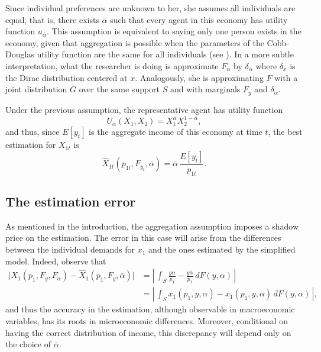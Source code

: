 \documentclass[english, a4paper,12pt]{article}
\begin{document}
Since individual preferences are unknown to her, she assumes all individuals are equal, that is, there exists $\overline{\alpha}$ such that every agent in this economy has utility function $u_{\overline{\alpha}}$. This assumption is equivalent to saying only one person exists in the economy, given that aggregation is possible when the parameters of the Cobb-Douglas utility function are the same for all individuals (see ). In a more subtle interpretation, what the researcher is doing is approximate $F_{\alpha}$ by $\delta_{\overline{\alpha}}$ where $\delta_{x}$ is the Dirac distribution centered at $x$. Analogously, she is approximating $F$ with a joint distribution $G$ over the same support $S$ and with marginals $F_{y}$ and $\delta_{\overline{\alpha}}$.

Under the previous assumption, the representative agent has utility function
	$$U_{\overline{\alpha}}(X_{1}, X_{2}) = X_{1}^{\overline{\alpha}}X_{2}^{1-\overline{\alpha}},$$
and thus, since $E[y_{t}]$ is the aggregate income of this economy at time $t$, the best estimation for $X_{1t}$ is
	$$\widehat{X}_{1t}(p_{1t}, F_{y_{t}}, \overline{\alpha}) = \overline{\alpha}\, \frac{E[y_{t}]}{p_{1t}}.$$

\subsection{The estimation error} \label{ssec:RepAgError}
As mentioned in the introduction, the aggregation assumption imposes a shadow price on the estimation. The error in this case will arise from the differences between the individual demands for $x_{1}$ and the ones estimated by the simplified model. Indeed, observe that
	\begin{align*}
		\Big| X_{1}(p_{1}, F_{y}, F_{\alpha}) - \widehat{X}_{1}(p_{1}, F_{y}, \overline{\alpha}) \Big|
			&=	\left|\, \int_{S} \frac{y \alpha}{p_{1}} - \frac{y\overline{\alpha}}{p_{1}} \, dF(y,\alpha) \,\right|	\\
			&=	\left|\, \int_{S} x_{1}(p_{1}, y, \alpha) - x_{1}(p_{1}, y, \overline{\alpha}) \, dF(y,\alpha)\, \right|,
	\end{align*}
and thus the accuracy in the estimation, although observable in macroeconomic variables, has its roots in microeconomic differences. Moreover, conditional on having the correct distribution of income, this discrepancy will depend only on the choice of $\overline{\alpha}$. 
\end{document}
